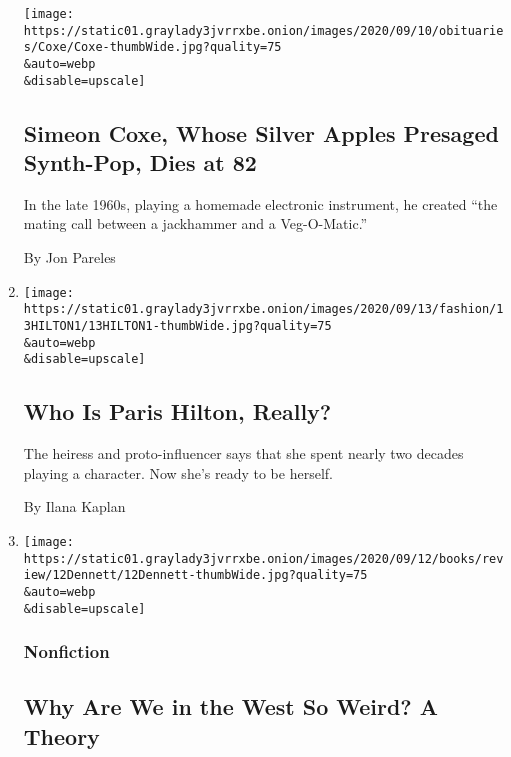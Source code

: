 \begin{enumerate}
  \texttt{[image: https://static01.graylady3jvrrxbe.onion/images/2020/09/10/obituaries/Coxe/Coxe-thumbWide.jpg?quality=75\\\&auto=webp\\\&disable=upscale]}

  \hypertarget{simeon-coxe-whose-silver-apples-presaged-synth-pop-dies-at-82}{%
  \subsection{Simeon Coxe, Whose Silver Apples Presaged Synth-Pop, Dies
  at
  82}\label{simeon-coxe-whose-silver-apples-presaged-synth-pop-dies-at-82}}

  In the late 1960s, playing a homemade electronic instrument, he
  created ``the mating call between a jackhammer and a Veg-O-Matic.''

  By Jon Pareles
\item
  \href{/2020/09/12/style/paris-hilton-documentary.html}{}

  \texttt{[image: https://static01.graylady3jvrrxbe.onion/images/2020/09/13/fashion/13HILTON1/13HILTON1-thumbWide.jpg?quality=75\\\&auto=webp\\\&disable=upscale]}

  \hypertarget{who-is-paris-hilton-really}{%
  \subsection{Who Is Paris Hilton,
  Really?}\label{who-is-paris-hilton-really}}

  The heiress and proto-influencer says that she spent nearly two
  decades playing a character. Now she's ready to be herself.

  By Ilana Kaplan
\item
  \href{/2020/09/12/books/review/the-weirdest-people-in-the-world-joseph-henrich.html}{}

  \texttt{[image: https://static01.graylady3jvrrxbe.onion/images/2020/09/12/books/review/12Dennett/12Dennett-thumbWide.jpg?quality=75\\\&auto=webp\\\&disable=upscale]}

  \hypertarget{nonfiction}{%
  \subsubsection{Nonfiction}\label{nonfiction}}

  \hypertarget{why-are-we-in-the-west-so-weird-a-theory}{%
  \subsection{Why Are We in the West So Weird? A
  Theory}\label{why-are-we-in-the-west-so-weird-a-theory}}


\end{enumerate}
